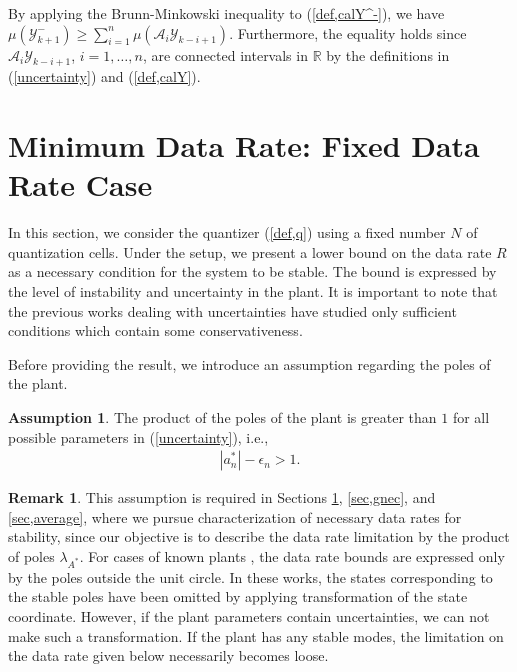 \documentclass[a4paper, 11pt]{article}
\makeatletter
\newcommand{\R}{\mathbb{R}}
\newcommand{\calY}{\mathcal{Y}}
\newcommand{\calA}{\mathcal{A}}
\newcommand{\lambdaAS}{\lambda_{A^*}\!}
\theoremstyle{definition}
\newtheorem{assum}{Assumption}
\newtheorem{rem}{Remark}
\newenvironment{pf}[1][\proofname]{\par\pushQED{\qed}
 \normalfont\topsep6\p@\@plus6\p@\relax\trivlist\item[\hskip\labelsep\bfseries#1\@addpunct{.}]
 \ignorespaces}{\popQED\endtrivlist\@endpefalse}
\makeatother
\begin{document}
\begin{pf}
 \begin{sloppypar}
 By applying the Brunn-Minkowski inequality \cite{Cover2006} to (\ref{def,calY^-}),
 we have $\mu(\calY^-_{k+1})\geq\sum_{i=1}^n\mu\left(\calA_i\calY_{k-i+1}\right)$.
 Furthermore, the equality holds since $\calA_i\calY_{k-i+1}$, $i=1,\dots,n$,
 are connected intervals in $\R$ by the definitions in (\ref{uncertainty})
 and (\ref{def,calY}).
 \end{sloppypar}
\end{pf}


\section{Minimum Data Rate: Fixed Data Rate Case}\label{sec,nec}
In this section, we consider the quantizer (\ref{def,q}) using a fixed number
$N$ of quantization cells.
Under the setup, we present a lower bound on the data rate $R$
as a necessary condition for the system to be stable.
The bound is expressed by the level of instability and uncertainty in the plant.
It is important to note that the previous works \cite{Phat2004, Martins2006, Fu2010}
dealing with uncertainties have studied only sufficient conditions
which contain some conservativeness.

Before providing the result, we introduce an assumption regarding
the poles of the plant.
\begin{assum}\label{asm,instability}
The product of the poles of the plant is greater than $1$ for all
possible parameters in (\ref{uncertainty}), i.e.,
\begin{align}
 |a_n^*|-\epsilon_n>1.\label{a-e>1}
\end{align}
\end{assum}

\begin{rem}
This assumption is required in Sections \ref{sec,nec}, \ref{sec,gnec}, and \ref{sec,average},
where we pursue characterization of necessary data rates for stability,
since our objective is to describe the data rate limitation by the product of poles
$\lambdaAS$.
For cases of known plants \cite{Nair2004, Tatikonda2004, Tatikonda2004a}, the data rate bounds are expressed only by the poles outside the unit circle.
In these works, the states corresponding to the stable poles
have been omitted by applying transformation of the state coordinate.
However, if the plant parameters contain uncertainties, we can not make
such a transformation.
If the plant has any stable modes, the limitation on the data rate
given below necessarily becomes loose.
\end{rem}
\end{document}
